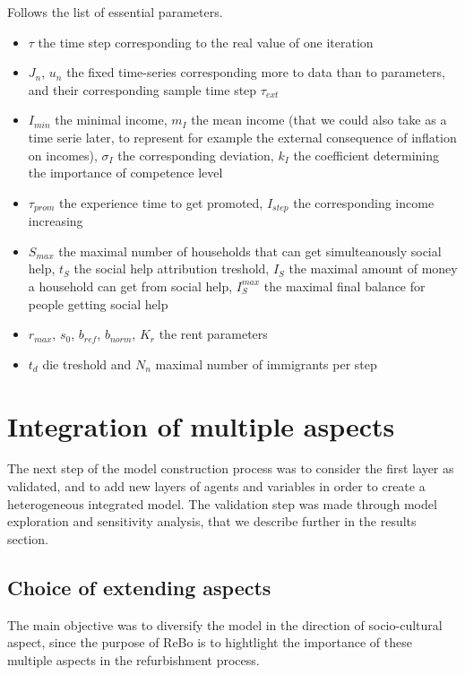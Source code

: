 \documentclass[english]{article}
\begin{document}
Follows the list of essential parameters.
\begin{itemize}
\item $\tau$ the time step corresponding to the real value of one iteration
\item $J_{n}$, $u_{n}$ the fixed time-series corresponding more to data
than to parameters, and their corresponding sample time step $\tau_{ext}$
\item $I_{min}$ the minimal income, $m_{I}$ the mean income (that we could
also take as a time serie later, to represent for example the external
consequence of inflation on incomes), $\sigma_{I}$ the corresponding
deviation, $k_{I}$ the coefficient determining the importance of
competence level
\item $\tau_{prom}$ the experience time to get promoted, $I_{step}$ the
corresponding income increasing
\item $S_{max}$ the maximal number of households that can get simulteanously
social help, $t_{S}$ the social help attribution treshold, $I_{S}$
the maximal amount of money a household can get from social help,
$I_{S}^{max}$ the maximal final balance for people getting social
help
\item $r_{max}$, $s_{0}$, $b_{ref}$, $b_{norm}$, $K_{r}$ the rent parameters
\item $t_{d}$ die treshold and $N_{n}$ maximal number of immigrants per
step
\end{itemize}

\section{Integration of multiple aspects}

The next step of the model construction process was to consider the
first layer as validated, and to add new layers of agents and variables
in order to create a heterogeneous integrated model. The validation
step was made through model exploration and sensitivity analysis,
that we describe further in the results section.


\subsection*{Choice of extending aspects}

The main objective was to diversify the model in the direction of
socio-cultural aspect, since the purpose of ReBo is to hightlight
the importance of these multiple aspects in the refurbishment process.
\end{document}
